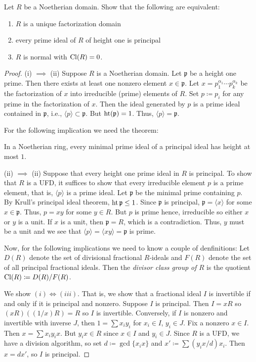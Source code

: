 \begin{problem}
Let $R$ be a Noetherian domain. Show that the following are equivalent:
\begin{enumerate}[label=(\roman*)]
\item $R$ is a unique factorization domain
\item every prime ideal of $R$ of height one is principal
\item $R$ is normal with $\operatorname{Cl}(R)=0$.
\end{enumerate}
\end{problem}
\begin{proof}
(i) $\implies$ (ii) Suppose $R$ is a Noetherian domain. Let $\mathfrak{p}$
be a height one prime. Then there exists at least one nonzero element
$x\in\mathfrak{p}$. Let $x=p_1^{\alpha_1}\cdots p_k^{\alpha_k}$ be the
factorization of $x$ into irreducible (prime) elements of $R$. Set
$p\coloneqq p_i$ for any prime in the factorization of $x$. Then the ideal
generated by $p$ is a prime ideal contained in $\mathfrak{p}$, i.e.,
$\langle p \rangle\subset\mathfrak{p}$. But $\operatorname{ht}(\mathfrak{p})=1$. Thus,
$\langle p \rangle=\mathfrak{p}$.

For the following implication we need the theorem:
\begin{theorem*}
In a Noetherian ring, every minimal prime ideal of a principal ideal has
height at most $1$.
\end{theorem*}

(ii) $\implies$ (ii) Suppose that every height one prime ideal in $R$ is
principal. To show that $R$ is a UFD, it suffices to show that every
irreducible element $p$ is a prime element, that is, $\langle p\rangle$ is
a prime ideal. Let $\mathfrak{p}$ be the minimal prime containing
$p$. By Krull's principal ideal theorem, $\operatorname{ht}\mathfrak{p}\leq 1$. Since
$\mathfrak{p}$ is principal, $\mathfrak{p}=\langle x\rangle$ for some
$x\in\mathfrak{p}$. Thus, $p=xy$ for some $y\in R$. But $p$ is prime hence,
irreducible so either $x$ or $y$ is a unit. If $x$ is a unit, then
$\mathfrak{p}=R$, which is a contradiction. Thus, $y$ must be a unit and we
see that $\langle p\rangle=\langle xy\rangle=\mathfrak{p}$ is prime.

Now, for the following implications we need to know a couple of
denfinitions: Let $D(R)$ denote the set of divisional fractional $R$-ideals
and $F(R)$ denote the set of all principal fractional ideals. Then the
\emph{divisor class group of $R$} is the quotient $\operatorname{Cl}(R)\coloneqq
D(R)/F(R)$.

We show $(i)\iff(iii)$. That is, we show that a fractional ideal $I$ is
invertible if and only if it is principal and nonzero. Suppose $I$ is
principal. Then $I=xR$ so $(xR)((1/x)R)=R$ so $I$ is
invertible. Conversely, if $I$ is nonzero and invertible with inverse $J$,
then $1=\sum x_iy_i$ for $x_i\in I$, $y_i\in J$. Fix a nonzero $x\in
I$. Then $x=\sum x_iy_ix$. But $y_ix\in R$ since $x\in I$ and $y_i\in
J$. Since $R$ is a UFD, we have a division algorithm, so set
$d\coloneqq\gcd\{x_ix\}$ and $x'\coloneqq\sum (y_ix/d)x_i$. Then $x=dx'$,
so $I$ is principal.
\end{proof}

